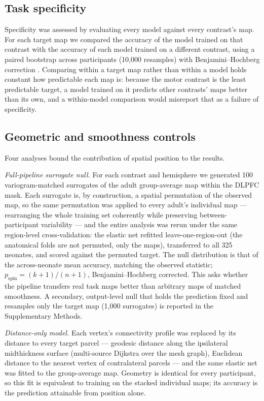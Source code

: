 \documentclass[11pt]{article}
\begin{document}
\subsection{Task specificity}

Specificity was assessed by evaluating every model against every contrast's
map. For each target map we compared the accuracy of the model trained on
that contrast with the accuracy of each model trained on a different
contrast, using a paired bootstrap across participants (10{,}000 resamples)
with Benjamini--Hochberg correction \citep{benjamini1995}. Comparing within
a target map rather than within a model holds constant how predictable each
map is: because the motor contrast is the least predictable target, a model
trained on it predicts other contrasts' maps better than its own, and a
within-model comparison would misreport that as a failure of specificity.

\subsection{Geometric and smoothness controls}

Four analyses bound the contribution of spatial position to the results.

\emph{Full-pipeline surrogate null.} For each contrast and hemisphere we
generated 100 variogram-matched surrogates \citep{burt2020} of the adult
group-average map within the DLPFC mask. Each surrogate is, by construction,
a spatial permutation of the observed map, so the same permutation was
applied to every adult's individual map --- rearranging the whole training
set coherently while preserving between-participant variability --- and the
entire analysis was rerun under the same region-level cross-validation: the
elastic net refitted leave-one-region-out (the anatomical folds are not
permuted, only the maps), transferred to all 325 neonates, and scored
against the permuted target. The null distribution is that of the
across-neonate mean accuracy, matching the observed statistic;
$p_{\mathrm{spin}} = (k+1)/(n+1)$, Benjamini--Hochberg corrected. This asks
whether the pipeline transfers real task maps better than arbitrary maps of
matched smoothness. A secondary, output-level null that holds the prediction
fixed and resamples only the target map (1{,}000 surrogates) is reported in
the Supplementary Methods.

\emph{Distance-only model.} Each vertex's connectivity profile was replaced
by its distance to every target parcel --- geodesic distance along the
ipsilateral midthickness surface (multi-source Dijkstra over the mesh
graph), Euclidean distance to the nearest vertex of contralateral parcels
--- and the same elastic net was fitted to the group-average map. Geometry
is identical for every participant, so this fit is equivalent to training on
the stacked individual maps; its accuracy is the prediction attainable from
position alone.
\end{document}
